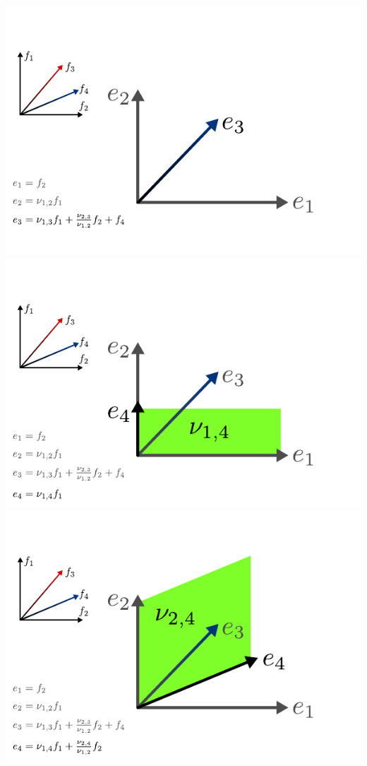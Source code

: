 \documentclass[compress]{beamer}
\begin{document}
\begin{frame}
\begin{center}
\begin{overprint}
      \includegraphics[scale=1.0]{../img/recursionformula/10.pdf}
      \includegraphics[scale=1.0]{../img/recursionformula/11.pdf}
      \includegraphics[scale=1.0]{../img/recursionformula/12.pdf}

\end{overprint}
\end{center}
\end{frame}
\end{document}
